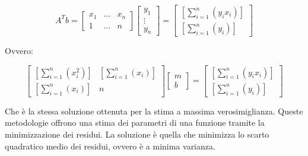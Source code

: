 \documentclass[\main/main.tex]{subfiles}
\begin{document}
\[
	A^Tb = \begin{bmatrix}
		x_1 & \dots & x_n \\
		1   & \dots & n
	\end{bmatrix}
	\begin{bmatrix}
		y_1    \\
		\vdots \\
		y_n
	\end{bmatrix}
	=
	\begin{bmatrix}
		\left [ \sum_{i=1}^n \left(y_i x_i \right) \right ] \\
		\left [ \sum_{i=1}^n \left(y_i \right) \right ]
	\end{bmatrix}
\]

Ovvero:

\[
	\begin{bmatrix}
		\left [ \sum_{i=1}^n \left(x_i^2 \right) \right ] & \left [ \sum_{i=1}^n \left(x_i \right) \right ] \\
		\left [ \sum_{i=1}^n \left(x_i \right) \right ]   & n
	\end{bmatrix}
	\begin{bmatrix}
		m \\
		b
	\end{bmatrix}
	=
	\begin{bmatrix}
		\left [ \sum_{i=1}^n \left(y_i x_i \right) \right ] \\
		\left [ \sum_{i=1}^n \left(y_i \right) \right ]
	\end{bmatrix}
\]

Che è la stessa soluzione ottenuta per la stima a massima verosimiglianza. Queste metodologie offrono una stima dei parametri di una funzione tramite la minimizzazione dei residui.
La soluzione è quella che minimizza lo scarto quadratico medio dei residui, ovvero è a minima varianza.
\end{document}
